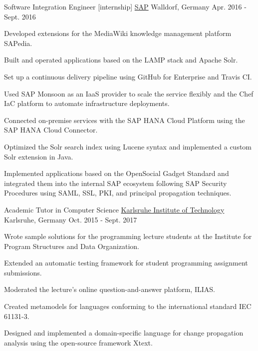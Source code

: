 \begin{cventries}
\cventry
{Software Integration Engineer [internship]} %
{\href{https://www.sap.com/about.html}{SAP}} %
{Walldorf, Germany} %
{Apr. 2016 - Sept. 2016} %
{
  \begin{cvitems} %
    \item {Developed extensions for the MediaWiki knowledge management platform SAPedia.}
    \item {Built and operated applications based on the LAMP stack and Apache Solr.}
    \item {Set up a continuous delivery pipeline using GitHub for Enterprise and Travis CI.}
    \item {Used SAP Monsoon as an IaaS provider to scale the service flexibly and the Chef IaC platform to automate infrastructure deployments.}
    \item {Connected on-premise services with the SAP HANA Cloud Platform using the SAP HANA Cloud Connector.}
    \item {Optimized the Solr search index using Lucene syntax and implemented a custom Solr extension in Java.}
    \item {Implemented applications based on the OpenSocial Gadget Standard and integrated them into the internal SAP ecosystem following SAP Security Procedures using SAML, SSL, PKI, and principal propagation techniques.}
  \end{cvitems}
}

\cventry
{Academic Tutor in Computer Science} %
{\href{https://www.informatik.kit.edu/english/index.php}{Karlsruhe Institute of Technology}} %
{Karlsruhe, Germany} %
{Oct. 2015 - Sept. 2017} %
{
  \begin{cvitems} %
    \item {Wrote sample solutions for the programming lecture students at the Institute for Program Structures and Data Organization.}
    \item {Extended an automatic testing framework for student programming assignment submissions.}
    \item {Moderated the lecture's online question-and-answer platform, ILIAS.}
    \item {Created metamodels for languages conforming to the international standard IEC 61131-3.}
    \item {Designed and implemented a domain-specific language for change propagation analysis using the open-source framework Xtext.}
  \end{cvitems}
}



\end{cventries}
